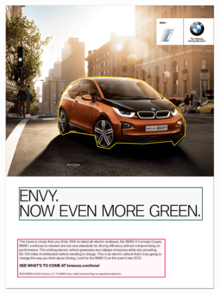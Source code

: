 \documentclass[hidelinks,11pt,a4paper]{report}
\begin{document}
\begin{figure}[!h]
\begin{subfigure}[b]{0.24\textwidth}
         \includegraphics[scale=0.22]{images/Image3.png}
     \end{subfigure}
     \begin{subfigure}[b]{0.24\textwidth}

\end{subfigure}
\end{figure}
\end{document}
